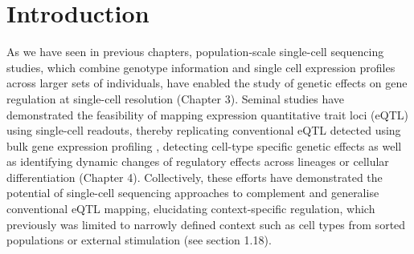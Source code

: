\newpage





\section{Introduction} 

As we have seen in previous chapters, population-scale single-cell sequencing studies, which combine genotype information and single cell expression profiles across larger sets of individuals, have enabled the study of genetic effects on gene regulation at single-cell resolution (Chapter
3). 
Seminal studies have demonstrated the feasibility of mapping expression quantitative trait loci (eQTL) using single-cell readouts, thereby replicating conventional eQTL detected using bulk gene expression profiling \cite{cuomo2020single, van2018single}, detecting cell-type specific genetic effects \cite{van2018single} as well as identifying dynamic changes of regulatory effects across lineages or cellular differentiation \cite{cuomo2020single} (Chapter 
4). 
Collectively, these efforts have demonstrated the potential of single-cell sequencing approaches to complement and generalise conventional eQTL mapping, elucidating context-specific regulation, which previously was limited to narrowly defined context such as cell types from sorted populations \cite{fairfax2012genetics} or external stimulation \cite{fairfax2014innate} (see section 
1.18).\\

